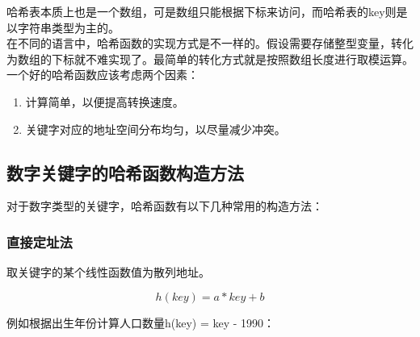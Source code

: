 哈希表本质上也是一个数组，可是数组只能根据下标来访问，而哈希表的key则是以字符串类型为主的。\\

在不同的语言中，哈希函数的实现方式是不一样的。假设需要存储整型变量，转化为数组的下标就不难实现了。最简单的转化方式就是按照数组长度进行取模运算。\\

一个好的哈希函数应该考虑两个因素：

\begin{enumerate}
	\item 计算简单，以便提高转换速度。
	\item 关键字对应的地址空间分布均匀，以尽量减少冲突。
\end{enumerate}

\vspace{0.5cm}

\subsection{数字关键字的哈希函数构造方法}

对于数字类型的关键字，哈希函数有以下几种常用的构造方法：

\subsubsection{直接定址法}

取关键字的某个线性函数值为散列地址。

\vspace{-0.5cm}

$$
	h(key) = a * key + b
$$

例如根据出生年份计算人口数量h(key) = key - 1990：

\begin{table}[H]
	\centering
	\caption{直接定址法}
\end{table}

